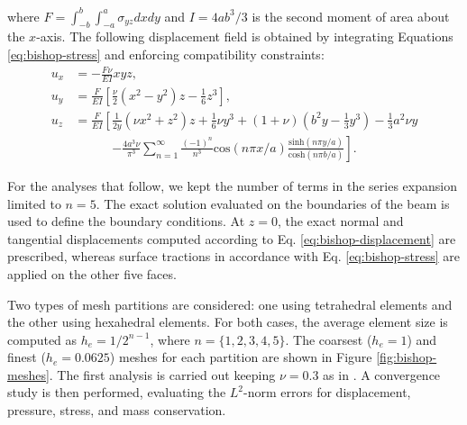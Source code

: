 \documentclass[english,11pt,3p,number,sort&compress]{elsarticle}
\begin{document}
\noindent where $F=\int_{-b}^{b}\int_{-a}^{a}\sigma_{yz}dxdy$ and $I=4ab^3/3$ is the second moment of area about the $x$-axis. The following displacement field is obtained by integrating Equations \eqref{eq:bishop-stress} and enforcing compatibility constraints:
\begin{equation} \label{eq:bishop-displacement}
	\begin{split}
		u_x & = -\frac{F\nu}{EI} xyz \text{,}\\
		u_y & = \frac{F}{EI} \left[ \frac{\nu}{2}\left(x^2-y^2\right)z - \frac{1}{6}z^3 \right] \text{,}\\
		u_z & = \frac{F}{EI} \left[ \frac{1}{2y}\left(\nu x^2+z^2\right)z + \frac{1}{6}\nu y^3 +(1+\nu) \left(b^2 y -\frac{1}{3}y^3\right) -\frac{1}{3}a^2 \nu y \right. \\
		&\qquad\quad \left.-\frac{4a^3\nu}{\pi^3} \sum_{n=1}^{\infty} \frac{(-1)^n}{n^3} \text{cos}\left(n\pi x/a\right) \frac{\text{sinh}\left( n\pi y/a \right)}{\text{cosh}\left( n\pi b/a \right)} \right] \text{.}
	\end{split}
\end{equation}

For the analyses that follow, we kept the number of terms in the series expansion limited to $n=5$. The exact solution evaluated on the boundaries of the beam is used to define the boundary conditions. At $z=0$, the exact normal and tangential displacements computed according to Eq. \eqref{eq:bishop-displacement} are prescribed, whereas surface tractions in accordance with Eq. \eqref{eq:bishop-stress} are applied on the other five faces.

Two types of mesh partitions are considered: one using tetrahedral elements and the other using hexahedral elements. For both cases, the average element size is computed as $h_e=1/2^{n-1}$, where $n=\{1,2,3,4,5\}$. The coarsest ($h_e=1$) and finest ($h_e=0.0625$) meshes for each partition are shown in Figure \ref{fig:bishop-meshes}. The first analysis is carried out keeping $\nu=0.3$ as in \cite{bishop2014displacement}. A convergence study is then performed, evaluating the $L^2$-norm errors for displacement, pressure, stress, and mass conservation.
\end{document}
